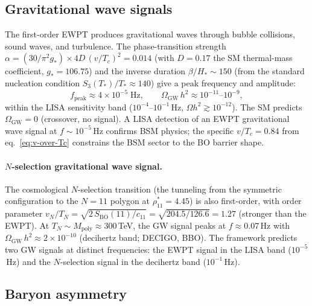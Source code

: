 \subsection{Gravitational wave signals}
\label{sec:gw-signals}
The first-order EWPT produces gravitational waves through
bubble collisions, sound waves, and turbulence.
The phase-transition strength
$\alpha = (30/\pi^2 g_*) \times 4D\,(v/T_c)^2 = 0.014$
(with $D = 0.17$ the SM thermal-mass coefficient,
$g_* = 106.75$)
and the inverse duration $\beta/H_* \sim 150$
(from the standard nucleation condition
$S_3(T_*)/T_* \approx 140$)
give a peak frequency and amplitude:
\begin{equation}\label{eq:gw-ewpt}
  f_{\mathrm{peak}} \approx 4 \times 10^{-5}\;\mathrm{Hz},
  \qquad
  \Omega_{\mathrm{GW}}\,h^2
  \approx 10^{-11}\text{--}10^{-9},
\end{equation}
within the LISA sensitivity band ($10^{-4}$--$10^{-1}$\,Hz,
$\Omega h^2 \gtrsim 10^{-12}$).
The SM predicts $\Omega_{\mathrm{GW}} = 0$ (crossover, no signal).
A LISA detection of an EWPT gravitational wave signal
at $f \sim 10^{-5}$\,Hz confirms BSM physics;
the specific $v/T_c = 0.84$ from eq.~\eqref{eq:v-over-Tc}
constrains the BSM sector to the BO barrier shape.

\paragraph{$N$-selection gravitational wave signal.}
The cosmological $N$-selection transition (the tunneling from the
symmetric configuration to the $N = 11$ polygon at $\rho^*_{11} = 4.45$)
is also first-order, with order parameter
$v_N/T_N = \sqrt{2\,S_{\mathrm{BO}}(11)/c_{11}}
= \sqrt{204.5/126.6} = 1.27$
(stronger than the EWPT).
At $T_N \sim M_{\mathrm{poly}} \approx 300$\,TeV,
the GW signal peaks at
$f \approx 0.07$\,Hz with
$\Omega_{\mathrm{GW}}\,h^2 \approx 2 \times 10^{-10}$
(decihertz band; DECIGO, BBO).
The framework predicts two GW signals at distinct frequencies:
the EWPT signal in the LISA band ($10^{-5}$\,Hz)
and the $N$-selection signal in the decihertz band
($10^{-1}$\,Hz).

\subsection{Baryon asymmetry}

